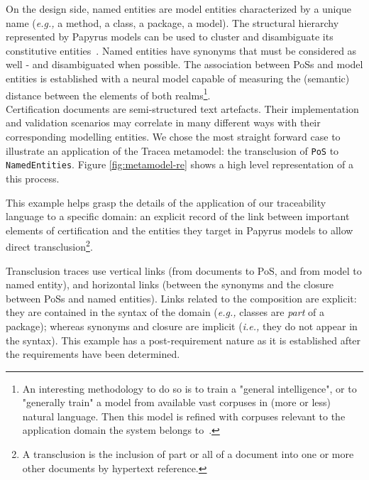 On the design side, named entities are model entities characterized by a unique name (\textit{e.g.,} a method, a class, a package, a model). The structural hierarchy represented by Papyrus models can be used to cluster and disambiguate its constitutive entities~\cite{patel2015-hierarchical-clustering}.
Named entities have synonyms that must be considered as well - and disambiguated when possible.
The association between PoSs and model entities is established with a neural model capable of measuring the (semantic) distance between the elements of both realms\footnote{An interesting methodology to do so is to train a "general intelligence", or to "generally train" a model from available vast corpuses in (more or less) natural language. Then this model is refined with corpuses relevant to the application domain the system belongs to~\cite{shen2015-linking-entities-with-knowledge-base}.}. 
\\
Certification documents are semi-structured text artefacts. Their implementation and validation scenarios may correlate in many different ways with their corresponding modelling entities. We chose the most straight forward case to illustrate an application of the Tracea metamodel: the transclusion of \texttt{PoS} to \texttt{NamedEntities}. Figure \ref{fig:metamodel-re} shows a high level representation of a this process.

This example helps grasp the details of the application of our traceability language to a specific domain: 
an explicit record of the link between important elements of certification and the entities they target in Papyrus models to allow direct transclusion\footnote{A transclusion is the inclusion of part or all of a document into one or more other documents by hypertext reference.}.

Transclusion traces use vertical links (from documents to PoS, and from model to named entity), and horizontal links (between the synonyms and the closure between PoSs and named entities). 
Links related to the composition are explicit: they are contained in the syntax of the domain (\textit{e.g.,} classes are \textit{part} of a package); whereas synonyms and closure are implicit (\textit{i.e.,} they do not appear in the syntax).
This example has a post-requirement nature as it is established after the requirements have been determined.
